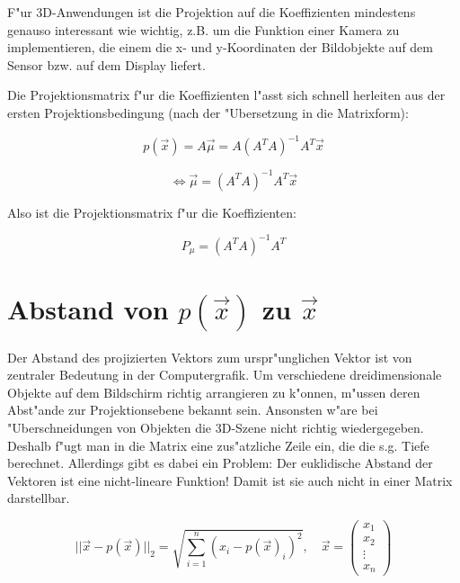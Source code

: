 \documentclass{article}
\begin{document}
F"ur 3D-Anwendungen ist die Projektion auf die Koeffizienten mindestens genauso
interessant wie wichtig, z.B. um die Funktion einer Kamera zu implementieren,
die einem die x- und y-Koordinaten der Bildobjekte auf dem Sensor bzw. auf dem
Display liefert.

Die Projektionsmatrix f"ur die Koeffizienten l"asst sich schnell herleiten aus
der ersten Projektionsbedingung (nach der "Ubersetzung in die Matrixform):

    \begin{equation}
        p(\vec{x}) = A \vec{\mu} = A(A^T A)^{-1} A^T \vec{x}
    \end{equation}

    \begin{equation}
        \iff \vec{\mu} = (A^T A)^{-1} A^T \vec{x}
    \end{equation}

Also ist die Projektionsmatrix f"ur die Koeffizienten:

    \begin{equation}
        P_{\mu} = (A^T A)^{-1} A^T
    \end{equation}

\section{Abstand von \(p(\vec{x})\) zu \(\vec{x}\)}

Der Abstand des projizierten Vektors zum urspr"unglichen Vektor ist von
zentraler Bedeutung in der Computergrafik. Um verschiedene dreidimensionale
Objekte auf dem Bildschirm richtig arrangieren zu k"onnen, m"ussen deren
Abst"ande zur Projektionsebene bekannt sein. Ansonsten w"are bei
"Uberschneidungen von Objekten die 3D-Szene nicht richtig wiedergegeben.
Deshalb f"ugt man in die Matrix eine zus"atzliche Zeile ein, die die s.g. Tiefe
berechnet. Allerdings gibt es dabei ein Problem: Der euklidische Abstand der
Vektoren ist eine nicht-lineare Funktion! Damit ist sie auch nicht in einer
Matrix darstellbar.

    \begin{equation}
        ||\vec{x} - p(\vec{x})||_2 = \sqrt{\sum_{i=1}^{n}{
        (x_i - p(\vec{x})_i)^2}}, \quad \vec{x} = \begin{pmatrix}
            x_1 \\
            x_2 \\
            \vdots \\
            x_n
        \end{pmatrix}
    \end{equation}
\end{document}
